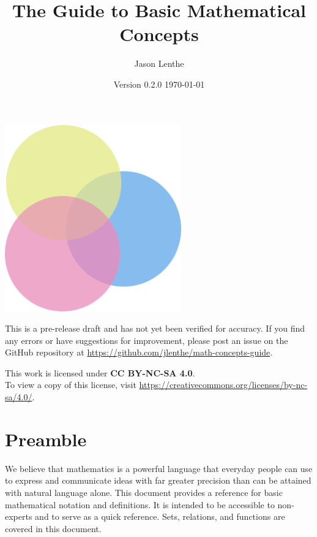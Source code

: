 \documentclass[letterpaper]{article}
\title{\sffamily\textbf{The Guide to Basic Mathematical Concepts}}
\author{\sffamily Jason Lenthe}
\date{Version 0.2.0 \quad \today}
\begin{document}
\maketitle
\vskip 0.5in
\begin{center}
    \includegraphics[width=3in]{images/logo.png}
\end{center}

\vfill
\begin{warning}
  This is a pre-release draft and has not yet been verified for accuracy.
  If you find any errors or have suggestions for improvement, please post
  an issue on the GitHub repository at
  \url{https://github.com/jlenthe/math-concepts-guide}.
\end{warning}
\begin{center}
    {\small This work is licensed under \textbf{CC BY-NC-SA 4.0}.\\
    To view a copy of this license, visit \url{https://creativecommons.org/licenses/by-nc-sa/4.0/}.}
\end{center}

\newpage
\tableofcontents
\newpage

\section*{Preamble}
We believe that mathematics is a powerful language that everyday people can
use to express and communicate ideas with far greater precision than can be
attained with natural language alone. This document provides a reference for
basic mathematical notation and definitions. It is intended to be accessible
to non-experts and to serve as a quick reference. Sets, relations, and
functions are covered in this document.









\end{document}

